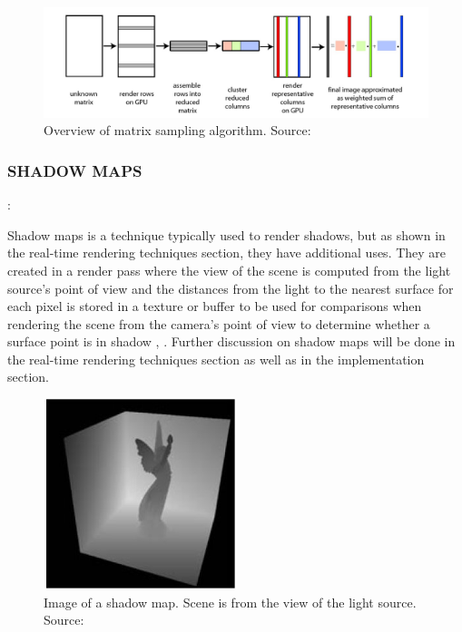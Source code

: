 \begin{figure}[h!]
  \centering
    \includegraphics[width=1.0\textwidth]{matrixSampling.jpg}
  \caption{Overview of matrix sampling algorithm. Source: \protect\cite{Havsan2007}}
	\label{fig:matrixSampling}
\end{figure}

\subsubsection{SHADOW MAPS}: 

Shadow maps is a technique typically used to render shadows, but as shown in the real-time rendering techniques section, they have additional uses.  They are created in a render pass where the view of the scene is computed from the light source's point of view and the distances from the light to the nearest surface for each pixel is stored in a texture or buffer to be used for comparisons when rendering the scene from the camera's point of view to determine whether a surface point is in shadow \cite{Williams1978}, \cite{Reeves1987}.  Further discussion on shadow maps will be done in the real-time rendering techniques section as well as in the implementation section.

\begin{figure}[h!]
  \centering
    \includegraphics[width=0.5\textwidth]{shadowMap1.jpg}
  \caption{Image of a shadow map. Scene is from the view of the light source. Source: \protect\cite{Dachsbacher2005}}
	\label{fig:shadowMap1}
\end{figure}

